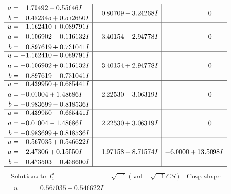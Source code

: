 \documentclass[1p]{elsarticle_modified}
\theoremstyle{definition}
\newcommand{\I}{\sqrt{-1}}
\begin{document}
$$\begin{array}{c|c|c}
\begin{aligned}
a &= \phantom{-}1.70492 - 0.55646 I \\
b &= \phantom{-}0.482345 + 0.572650 I\end{aligned}
 & \phantom{-}0.80709 - 3.24268 I & \phantom{-0.000000 } 0 \\ \hline\begin{aligned}
u &= -1.162410 + 0.089791 I \\
a &= -0.106902 - 0.116132 I \\
b &= \phantom{-}0.897619 + 0.731041 I\end{aligned}
 & \phantom{-}3.40154 - 2.94778 I & \phantom{-0.000000 } 0 \\ \hline\begin{aligned}
u &= -1.162410 - 0.089791 I \\
a &= -0.106902 + 0.116132 I \\
b &= \phantom{-}0.897619 - 0.731041 I\end{aligned}
 & \phantom{-}3.40154 + 2.94778 I & \phantom{-0.000000 } 0 \\ \hline\begin{aligned}
u &= \phantom{-}0.439950 + 0.685441 I \\
a &= -0.01004 + 1.48686 I \\
b &= -0.983699 - 0.818536 I\end{aligned}
 & \phantom{-}2.22530 - 3.06319 I & \phantom{-0.000000 } 0 \\ \hline\begin{aligned}
u &= \phantom{-}0.439950 - 0.685441 I \\
a &= -0.01004 - 1.48686 I \\
b &= -0.983699 + 0.818536 I\end{aligned}
 & \phantom{-}2.22530 + 3.06319 I & \phantom{-0.000000 } 0 \\ \hline\begin{aligned}
u &= \phantom{-}0.567035 + 0.546622 I \\
a &= -2.47306 + 0.15550 I \\
b &= -0.473503 - 0.438600 I\end{aligned}
 & \phantom{-}1.97158 - 8.71574 I & -6.0000 + 13.5098 I\\
 \hline 
 \end{array}$$\newpage$$\begin{array}{c|c|c}  
\text{Solutions to }I^u_{1}& \I (\text{vol} + \sqrt{-1}CS) & \text{Cusp shape}\\
 \hline 
\begin{aligned}
u &= \phantom{-}0.567035 - 0.546622 I \\

\end{aligned}
\end{array}$$
\end{document}
